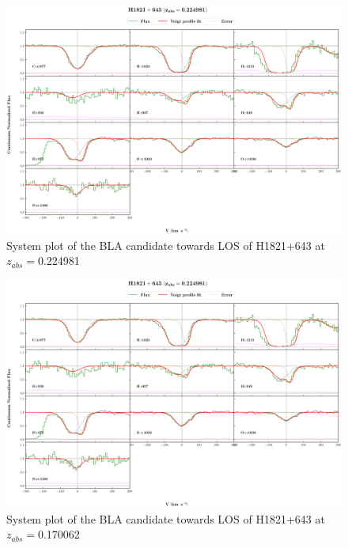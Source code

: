 \begin{landscape}
\begin{figure} 
  \centering  
  \hspace*{-21mm}
    \includegraphics[width=\linewidth]{Figures//system-plots/H1821+643_z=0.224981_sys_plot.png} 
  \caption{System plot of the BLA candidate towards LOS of H1821+643 at $z_{abs}=$0.224981} 
\end{figure}


\begin{figure} 
  \centering  
  \hspace*{-21mm}
    \includegraphics[width=\linewidth]{Figures//system-plots/H1821+643_z=0.224981_sys_plot.png} 
  \caption{System plot of the BLA candidate towards LOS of H1821+643 at $z_{abs}=$0.170062} 
\end{figure}




\end{landscape}
